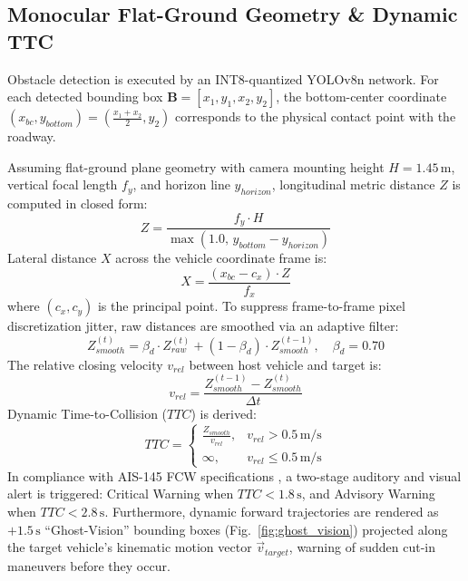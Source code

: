 \documentclass[conference]{IEEEtran}
\begin{document}
\subsection{Monocular Flat-Ground Geometry \& Dynamic TTC}
Obstacle detection is executed by an INT8-quantized YOLOv8n network. For each detected bounding box $\mathbf{B} = [x_1, y_1, x_2, y_2]$, the bottom-center coordinate $(x_{bc}, y_{bottom}) = (\frac{x_1 + x_2}{2}, y_2)$ corresponds to the physical contact point with the roadway.

Assuming flat-ground plane geometry with camera mounting height $H = 1.45\,\text{m}$, vertical focal length $f_y$, and horizon line $y_{horizon}$, longitudinal metric distance $Z$ is computed in closed form:
\begin{equation}
Z = \frac{f_y \cdot H}{\max\left(1.0, \, y_{bottom} - y_{horizon}\right)}
\label{eq:distance}
\end{equation}
Lateral distance $X$ across the vehicle coordinate frame is:
\begin{equation}
X = \frac{(x_{bc} - c_x) \cdot Z}{f_x}
\end{equation}
where $(c_x, c_y)$ is the principal point. To suppress frame-to-frame pixel discretization jitter, raw distances are smoothed via an adaptive filter:
\begin{equation}
Z_{smooth}^{(t)} = \beta_d \cdot Z_{raw}^{(t)} + (1 - \beta_d) \cdot Z_{smooth}^{(t-1)}, \quad \beta_d = 0.70
\end{equation}
The relative closing velocity $v_{rel}$ between host vehicle and target is:
\begin{equation}
v_{rel} = \frac{Z_{smooth}^{(t-1)} - Z_{smooth}^{(t)}}{\Delta t}
\end{equation}
Dynamic Time-to-Collision ($TTC$) is derived:
\begin{equation}
TTC = 
\begin{cases} 
\frac{Z_{smooth}}{v_{rel}}, & v_{rel} > 0.5\,\text{m/s} \\
\infty, & v_{rel} \le 0.5\,\text{m/s}
\end{cases}
\label{eq:ttc}
\end{equation}
In compliance with AIS-145 FCW specifications \cite{ais145_2020}, a two-stage auditory and visual alert is triggered: Critical Warning when $TTC < 1.8\,\text{s}$, and Advisory Warning when $TTC < 2.8\,\text{s}$. Furthermore, dynamic forward trajectories are rendered as $+1.5\,\text{s}$ ``Ghost-Vision'' bounding boxes (Fig.~\ref{fig:ghost_vision}) projected along the target vehicle's kinematic motion vector $\vec{v}_{target}$, warning of sudden cut-in maneuvers before they occur.
\end{document}

